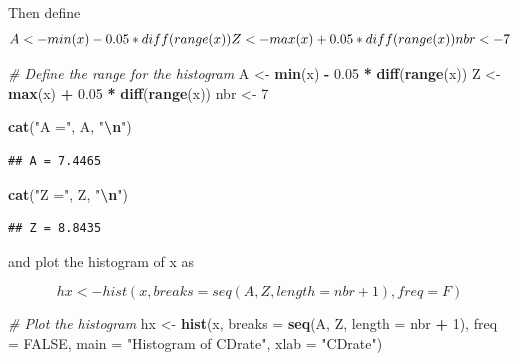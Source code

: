 \documentclass[
]{article}
\newenvironment{Shaded}{\begin{snugshade}}{\end{snugshade}}
\newcommand{\AttributeTok}[1]{\textcolor[rgb]{0.13,0.29,0.53}{#1}}
\newcommand{\CommentTok}[1]{\textcolor[rgb]{0.56,0.35,0.01}{\textit{#1}}}
\newcommand{\ConstantTok}[1]{\textcolor[rgb]{0.56,0.35,0.01}{#1}}
\newcommand{\DecValTok}[1]{\textcolor[rgb]{0.00,0.00,0.81}{#1}}
\newcommand{\FloatTok}[1]{\textcolor[rgb]{0.00,0.00,0.81}{#1}}
\newcommand{\FunctionTok}[1]{\textcolor[rgb]{0.13,0.29,0.53}{\textbf{#1}}}
\newcommand{\NormalTok}[1]{#1}
\newcommand{\OtherTok}[1]{\textcolor[rgb]{0.56,0.35,0.01}{#1}}
\newcommand{\SpecialCharTok}[1]{\textcolor[rgb]{0.81,0.36,0.00}{\textbf{#1}}}
\newcommand{\StringTok}[1]{\textcolor[rgb]{0.31,0.60,0.02}{#1}}
\begin{document}
Then define \[
A <- min(x) - 0.05 * diff(range(x))\\
Z <- max(x) + 0.05 * diff(range(x))\\
nbr <- 7
\]

\begin{Shaded}
\begin{Highlighting}[]
\CommentTok{\# Define the range for the histogram}
\NormalTok{A }\OtherTok{\textless{}{-}} \FunctionTok{min}\NormalTok{(x) }\SpecialCharTok{{-}} \FloatTok{0.05} \SpecialCharTok{*} \FunctionTok{diff}\NormalTok{(}\FunctionTok{range}\NormalTok{(x))}
\NormalTok{Z }\OtherTok{\textless{}{-}} \FunctionTok{max}\NormalTok{(x) }\SpecialCharTok{+} \FloatTok{0.05} \SpecialCharTok{*} \FunctionTok{diff}\NormalTok{(}\FunctionTok{range}\NormalTok{(x))}
\NormalTok{nbr }\OtherTok{\textless{}{-}} \DecValTok{7}

\FunctionTok{cat}\NormalTok{(}\StringTok{"A ="}\NormalTok{, A, }\StringTok{"}\SpecialCharTok{\textbackslash{}n}\StringTok{"}\NormalTok{)}
\end{Highlighting}
\end{Shaded}

\begin{verbatim}
## A = 7.4465
\end{verbatim}

\begin{Shaded}
\begin{Highlighting}[]
\FunctionTok{cat}\NormalTok{(}\StringTok{"Z ="}\NormalTok{, Z, }\StringTok{"}\SpecialCharTok{\textbackslash{}n}\StringTok{"}\NormalTok{)}
\end{Highlighting}
\end{Shaded}

\begin{verbatim}
## Z = 8.8435
\end{verbatim}

and plot the histogram of x as

\[
hx <- hist(x,breaks=seq(A,Z,length=nbr+1),freq=F)
\]

\begin{Shaded}
\begin{Highlighting}[]
\CommentTok{\# Plot the histogram}
\NormalTok{hx }\OtherTok{\textless{}{-}} \FunctionTok{hist}\NormalTok{(x, }\AttributeTok{breaks =} \FunctionTok{seq}\NormalTok{(A, Z, }\AttributeTok{length =}\NormalTok{ nbr }\SpecialCharTok{+} \DecValTok{1}\NormalTok{), }\AttributeTok{freq =} \ConstantTok{FALSE}\NormalTok{,}
           \AttributeTok{main =} \StringTok{"Histogram of CDrate"}\NormalTok{, }\AttributeTok{xlab =} \StringTok{"CDrate"}\NormalTok{)}
\end{Highlighting}
\end{Shaded}
\end{document}
